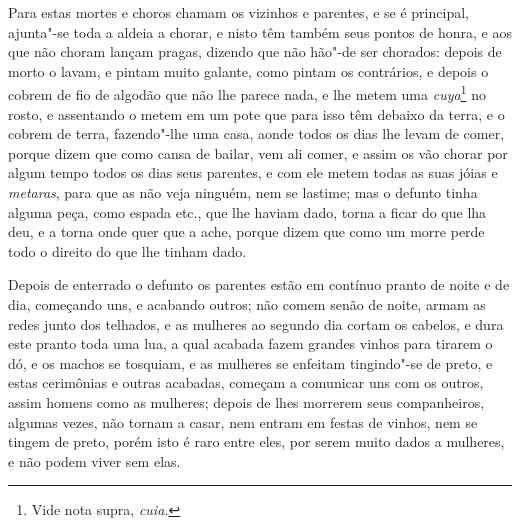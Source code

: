 \begin{linenumbers}
 Para estas mortes e choros chamam os vizinhos e parentes, e se é
principal, ajunta"-se toda a aldeia a chorar, e nisto têm também seus
pontos de honra, e aos que não choram lançam pragas, dizendo que não
hão"-de ser chorados: depois de morto o lavam, e pintam muito galante,
como pintam os contrários, e depois o cobrem de fio de algodão que não
lhe parece nada, e lhe metem uma \textit{cuya}\footnote{ Vide nota
supra, \textit{cuia.}} no rosto, e assentando o metem em um
pote que para isso têm debaixo da terra, e o cobrem de terra,
fazendo"-lhe uma casa, aonde todos os dias lhe levam de comer, porque
dizem que como cansa de bailar, vem ali comer, e assim os vão chorar
por algum tempo todos os dias seus parentes, e com ele metem todas as
suas jóias e \textit{metaras}, para que as não veja ninguém, nem se
lastime; mas o defunto tinha alguma peça, como espada etc., que lhe
haviam dado, torna a ficar do que lha deu, e a torna onde quer que a
ache, porque dizem que como um morre perde todo o direito do que lhe tinham dado.

 Depois de enterrado o defunto os parentes estão em contínuo pranto de
noite e de dia, começando uns, e acabando outros; não comem senão de
noite, armam as redes junto dos telhados, e as mulheres ao segundo dia
cortam os cabelos, e dura este pranto toda uma lua, a qual acabada
fazem grandes vinhos para tirarem o dó, e os machos se tosquiam, e as
mulheres se enfeitam tingindo"-se de preto, e estas cerimônias e outras
acabadas, começam a comunicar uns com os outros, assim homens como as
mulheres; depois de lhes morrerem seus companheiros, algumas vezes, não
tornam a casar, nem entram em festas de vinhos, nem se tingem de preto,
porém isto é raro entre eles, por serem muito dados a mulheres, e não
podem viver sem elas.


\end{linenumbers}
